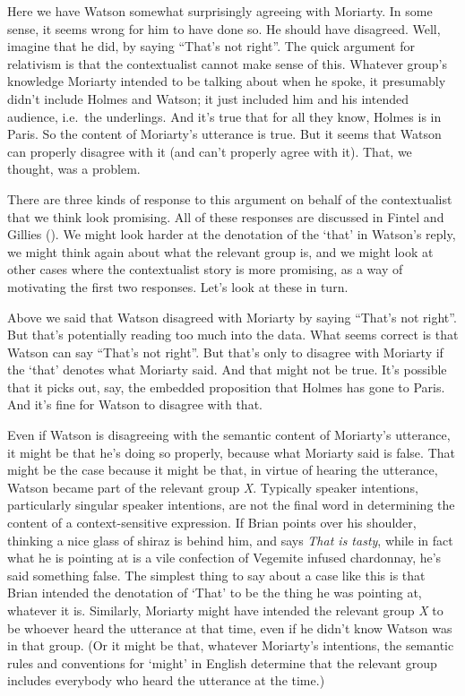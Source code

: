 \documentclass[
  10pt,
  letterpaper,
  DIV=11,
  numbers=noendperiod,
  twoside]{scrartcl}
\begin{document}
Here we have Watson somewhat surprisingly agreeing with Moriarty. In
some sense, it seems wrong for him to have done so. He should have
disagreed. Well, imagine that he did, by saying ``That's not right''.
The quick argument for relativism is that the contextualist cannot make
sense of this. Whatever group's knowledge Moriarty intended to be
talking about when he spoke, it presumably didn't include Holmes and
Watson; it just included him and his intended audience, i.e.~the
underlings. And it's true that for all they know, Holmes is in Paris. So
the content of Moriarty's utterance is true. But it seems that Watson
can properly disagree with it (and can't properly agree with it). That,
we thought, was a problem.

There are three kinds of response to this argument on behalf of the
contextualist that we think look promising. All of these responses are
discussed in Fintel and Gillies (). We
might look harder at the denotation of the `that' in Watson's reply, we
might think again about what the relevant group is, and we might look at
other cases where the contextualist story is more promising, as a way of
motivating the first two responses. Let's look at these in turn.

Above we said that Watson disagreed with Moriarty by saying ``That's not
right''. But that's potentially reading too much into the data. What
seems correct is that Watson can say ``That's not right''. But that's
only to disagree with Moriarty if the `that' denotes what Moriarty said.
And that might not be true. It's possible that it picks out, say, the
embedded proposition that Holmes has gone to Paris. And it's fine for
Watson to disagree with that.

Even if Watson is disagreeing with the semantic content of Moriarty's
utterance, it might be that he's doing so properly, because what
Moriarty said is false. That might be the case because it might be that,
in virtue of hearing the utterance, Watson became part of the relevant
group \emph{X}. Typically speaker intentions, particularly singular
speaker intentions, are not the final word in determining the content of
a context-sensitive expression. If Brian points over his shoulder,
thinking a nice glass of shiraz is behind him, and says \emph{That is
tasty}, while in fact what he is pointing at is a vile confection of
Vegemite infused chardonnay, he's said something false. The simplest
thing to say about a case like this is that Brian intended the
denotation of `That' to be the thing he was pointing at, whatever it is.
Similarly, Moriarty might have intended the relevant group \emph{X} to
be whoever heard the utterance at that time, even if he didn't know
Watson was in that group. (Or it might be that, whatever Moriarty's
intentions, the semantic rules and conventions for `might' in English
determine that the relevant group includes everybody who heard the
utterance at the time.)
\end{document}
